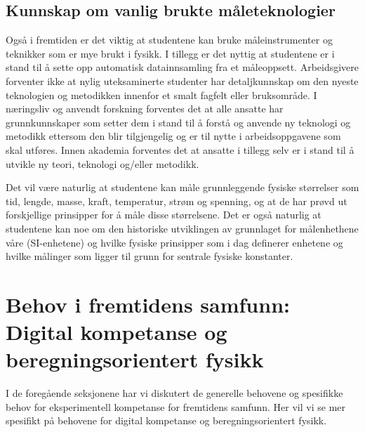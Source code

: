 \documentclass{article}
\begin{document}
\subsection{Kunnskap om vanlig brukte måleteknologier}
Også i fremtiden er det viktig at studentene kan bruke måleinstrumenter og teknikker som er mye brukt i fysikk. I tillegg er det nyttig at studentene er i stand til å sette opp automatisk datainnsamling fra et måleoppsett.
Arbeidsgivere forventer ikke at nylig uteksaminerte studenter har detaljkunnskap om den nyeste teknologien og metodikken innenfor et smalt fagfelt eller bruksområde.
I næringsliv og anvendt forskning forventes det at alle ansatte har grunnkunnskaper som setter dem i stand til å forstå og anvende ny teknologi og metodikk ettersom den blir tilgjengelig og er til nytte i arbeidsoppgavene som skal utføres.
Innen akademia forventes det at ansatte i tillegg selv er i stand til å utvikle ny teori, teknologi og/eller metodikk.

Det vil være naturlig at studentene kan måle grunnleggende fysiske størrelser som tid, lengde, masse, kraft, temperatur, strøm og spenning, og at de har prøvd ut forskjellige prinsipper for å måle disse størrelsene. Det er også naturlig at studentene kan noe om den historiske utviklingen av grunnlaget for målenhethene våre (SI-enhetene) og hvilke fysiske prinsipper som i dag definerer enhetene og hvilke målinger som ligger til grunn for sentrale fysiske konstanter.


\section{Behov i fremtidens samfunn: Digital kompetanse og beregningsorientert fysikk}
\label{sec:behov-dig}
I de foregående seksjonene har vi diskutert de generelle behovene og spesifikke behov for eksperimentell kompetanse for fremtidens samfunn. Her vil vi se mer spesifikt på behovene for digital kompetanse og beregningsorientert fysikk.
\end{document}
